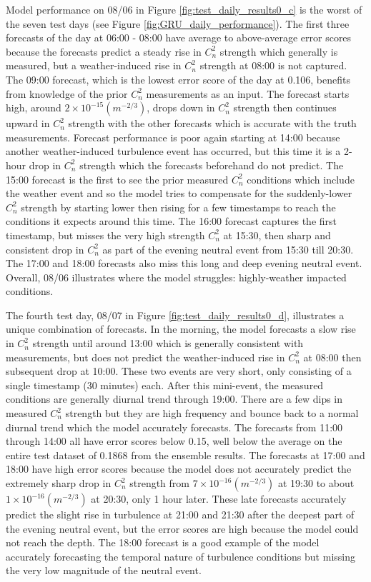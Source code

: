 Model performance on 08/06 in Figure \ref{fig:test_daily_results0_c} is the worst of the seven test days (see Figure \ref{fig:GRU_daily_performance}). The first three forecasts of the day at 06:00 - 08:00 have average to above-average error scores because the forecasts predict a steady rise in $C_{n}^{2}$ strength which generally is measured, but a weather-induced rise in $C_{n}^{2}$ strength at 08:00 is not captured. The 09:00 forecast, which is the lowest error score of the day at 0.106, benefits from knowledge of the prior $C_{n}^{2}$ measurements as an input. The forecast starts high, around $2 \times 10^{-15} (m^{-2/3})$, drops down in $C_{n}^{2}$ strength then continues upward in $C_{n}^{2}$ strength with the other forecasts which is accurate with the truth measurements. Forecast performance is poor again starting at 14:00 because another weather-induced turbulence event has occurred, but this time it is a 2-hour drop in $C_{n}^{2}$ strength which the forecasts beforehand do not predict. The 15:00 forecast is the first to see the prior measured $C_{n}^{2}$ conditions which include the weather event and so the model tries to compensate for the suddenly-lower $C_{n}^{2}$ strength by starting lower then rising for a few timestamps to reach the conditions it expects around this time. The 16:00 forecast captures the first timestamp, but misses the very high strength $C_{n}^{2}$ at 15:30, then sharp and consistent drop in $C_{n}^{2}$ as part of the evening neutral event from 15:30 till 20:30. The 17:00 and 18:00 forecasts also miss this long and deep evening neutral event. Overall, 08/06 illustrates where the model struggles: highly-weather impacted conditions.

The fourth test day, 08/07 in Figure \ref{fig:test_daily_results0_d}, illustrates a unique combination of forecasts. In the morning, the model forecasts a slow rise in $C_{n}^{2}$ strength until around 13:00 which is generally consistent with measurements, but does not predict the weather-induced rise in $C_{n}^{2}$ at 08:00 then subsequent drop at 10:00. These two events are very short, only consisting of a single timestamp (30 minutes) each. After this mini-event, the measured conditions are generally diurnal trend through 19:00. There are a few dips in measured $C_{n}^{2}$ strength but they are high frequency and bounce back to a normal diurnal trend which the model accurately forecasts. The forecasts from 11:00 through 14:00 all have error scores below 0.15, well below the average on the entire test dataset of 0.1868 from the ensemble results. The forecasts at 17:00 and 18:00 have high error scores because the model does not accurately predict the extremely sharp drop in $C_{n}^{2}$ strength from $7 \times 10^{-16} (m^{-2/3})$ at 19:30 to about $1 \times 10^{-16} (m^{-2/3})$ at 20:30, only 1 hour later. These late forecasts accurately predict the slight rise in turbulence at 21:00 and 21:30 after the deepest part of the evening neutral event, but the error scores are high because the model could not reach the depth. The 18:00 forecast is a good example of the model accurately forecasting the temporal nature of turbulence conditions but missing the very low magnitude of the neutral event.

